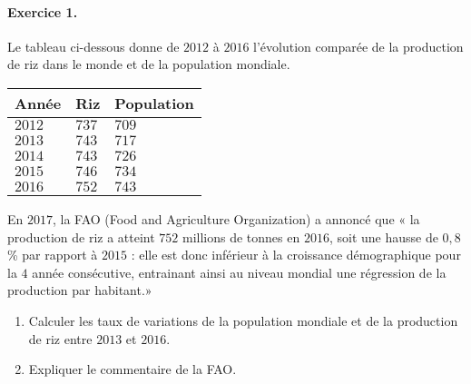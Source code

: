 \documentclass[11pt]{article}
\begin{document}
\paragraph{Exercice 1.}
Le tableau ci-dessous donne de $2012$ à $2016$ l'évolution comparée de la
production de riz dans le monde et de la population mondiale.
\begin{center}
	\begin{tabular}{|>{\centering\arraybackslash}m{2cm}|
      >{\centering\arraybackslash}m{2cm}|>{\centering\arraybackslash}m{2cm}|}
			\hline
			\rule[-1ex]{0pt}{2.5ex} \textbf{Année} & \textbf{Riz} & \textbf{Population} \\
			\hline
			\rule[-1ex]{0pt}{2.5ex} $2012$ & $737$ & $709$ \\
			\hline
			\rule[-1ex]{0pt}{2.5ex} $2013$ & $743$ & $717$ \\
			\hline
			\rule[-1ex]{0pt}{2.5ex} $2014$ & $743$ & $726$ \\
			\hline
			\rule[-1ex]{0pt}{2.5ex} $2015$ & $746$ & $734$ \\
			\hline
			\rule[-1ex]{0pt}{2.5ex} $2016$ & $752$ & $743$ \\
			\hline
		\end{tabular}
\end{center}
En  $2017$, la FAO (Food and Agriculture Organization) a annoncé que « la
production de riz a atteint $752$ millions de tonnes en $2016$, soit une hausse
de $0,8$ \% par rapport à $2015$ : elle est donc inférieur à la croissance
démographique pour la $4$ année consécutive, entrainant ainsi au niveau
mondial une régression de la production par habitant.»
\begin{enumerate}
  \item Calculer les taux de variations de la population mondiale et de la
    production de riz entre $2013$ et $2016$.
  \item Expliquer le commentaire de la FAO.
\end{enumerate}
\end{document}
